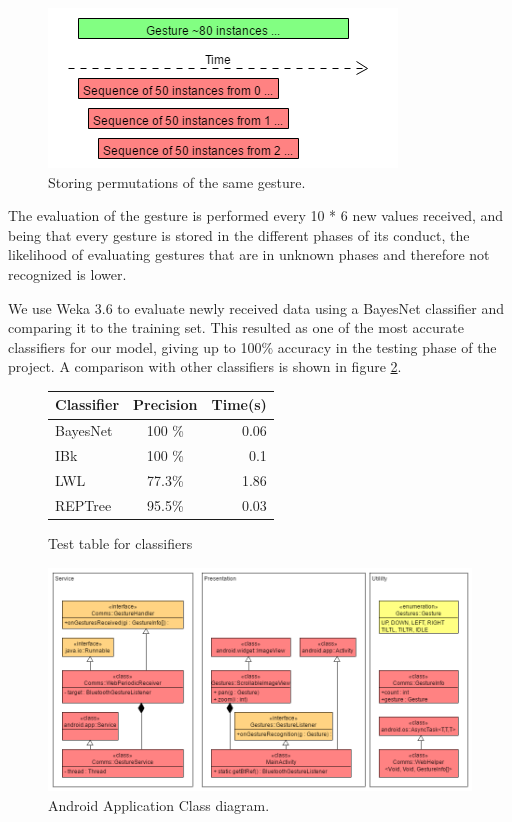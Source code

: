 \begin{figure}[!h]
\centering
\includegraphics[width=1\columnwidth]{img/gesture_window_example}
\caption{Storing permutations of the same gesture.}
\label{fig:training}
\end{figure}

The evaluation of the gesture is performed every 10 * 6 new values received,
 and being that every gesture is stored in the different phases of its conduct,
  the likelihood of evaluating gestures that are in unknown phases and therefore not recognized is lower.

We use Weka 3.6 to evaluate newly received data using a BayesNet classifier and comparing it to the training set. 
This resulted as one of the most accurate classifiers for our model, giving up to 100\% accuracy in the testing phase of the project. A comparison with other classifiers is shown in figure \ref{fig:wekaclass}.

\begin{figure}[h]
\begin{center}
\begin{tabular}{ l  c r }
Classifier & Precision & Time(s)\\ [0.5ex]
\hline \hline
BayesNet & 100 \%  & 0.06\\ 
IBk & 100 \% & 0.1 \\
LWL & 77.3\%  & 1.86\\
REPTree & 95.5\%  & 0.03 \\ [1ex]
\end{tabular}
\end{center}
\caption{Test table for classifiers}
\label{fig:wekaclass}
\end{figure}

\begin{figure}[!h]
\centering
\includegraphics[width=1\columnwidth]{img/android_class_diagram}
\caption{Android Application Class diagram.}
\label{fig:and_class}
\end{figure}

